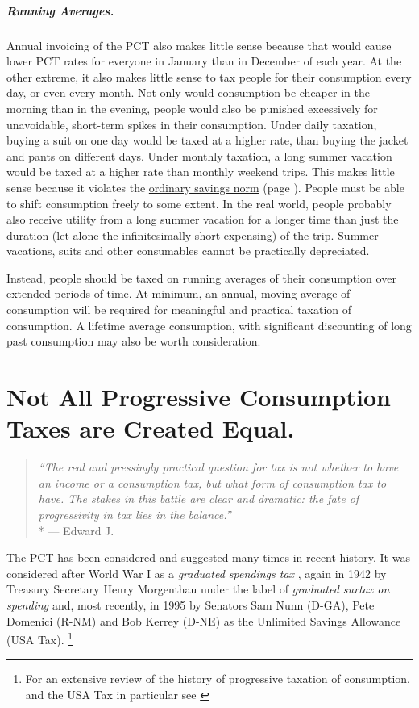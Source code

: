 \subparagraph{Running Averages.}
Annual invoicing of the PCT also makes little sense because that would cause lower PCT rates for everyone in January than in December of each year.
At the other extreme, it also makes little sense to tax people for their consumption every day, or even every month.
Not only would consumption be cheaper in the morning than in the evening, people would also be punished excessively for unavoidable, short-term spikes in their consumption.
Under daily taxation, buying a suit on one day would be taxed at a higher rate, than buying the jacket and pants on different days.
Under monthly taxation, a long summer vacation would be taxed at a higher rate than monthly weekend trips.
This makes little sense because it violates the \hyperref[sec:OSN]{ordinary savings norm} (page \pageref{sec:OSN}).
People must be able to shift consumption freely to some extent.
In the real world, people probably also receive utility from a long summer vacation for a longer time than just the duration (let alone the infinitesimally short expensing) of the trip.
Summer vacations, suits and other consumables cannot be practically depreciated.

Instead, people should be taxed on running averages of their consumption over extended periods of time.
At minimum, an annual, moving average of consumption will be required for meaningful and practical taxation of consumption.
A lifetime average consumption, with significant discounting of long past consumption may also be worth consideration.


\section[The PCT's Evil Twins]{Not All Progressive Consumption Taxes are Created Equal.}
	\label{sec:PCTTwins}

\begin{quote}
	\emph{``The real and pressingly practical question for tax is not whether to have an income or a consumption tax, but what form of consumption tax to have.
	The stakes in this battle are clear and dramatic:
	the fate of progressivity in tax lies in the balance.''}
	\\*
	--- Edward J.\ \citet[817]{McCaffery2005}
\end{quote}

The PCT has been considered and suggested many times in recent history.
It was considered after World War I as a \emph{graduated spendings tax} \citep[2]{Bank2004}, again in 1942 by Treasury Secretary Henry Morgenthau under the label of \emph{graduated surtax on spending} and, most recently, in 1995 by Senators Sam Nunn (D-GA), Pete Domenici (R-NM) and Bob Kerrey (D-NE) as the Unlimited Savings Allowance (USA Tax).
\footnote{
	For an extensive review of the history of progressive taxation of consumption, and the USA Tax in particular see \citealt[11ff]{Seidman1997}
}


